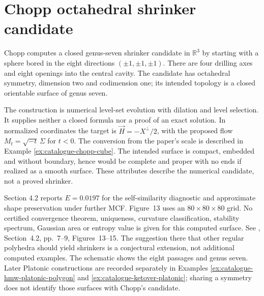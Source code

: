 \chapter{Chopp octahedral shrinker candidate}\label{sec:catalogue-chopp-octahedron}
\begin{example}\label{ex:catalogue-chopp-octahedron}
Chopp computes a closed genus-seven shrinker candidate in $\mathbb R^3$ by
starting with a sphere bored in the eight directions $(\pm1,\pm1,\pm1)$.
There are four drilling axes and eight openings into the central cavity.
The candidate has octahedral symmetry, dimension two and codimension one;
its intended topology is a closed orientable surface of genus seven.

The construction is numerical level-set evolution with dilation and level
selection. It supplies neither a closed formula nor a proof of an exact
solution. In normalized coordinates the target is
$\vec H=-X^\perp/2$, with the proposed flow
$M_t=\sqrt{-t}\,\Sigma$ for $t<0$. The conversion from the paper's scale
is described in Example \ref{ex:catalogue-chopp-cube}.
The intended surface is compact, embedded and without boundary, hence
would be complete and proper with no ends if realized as a smooth surface.
These attributes describe the numerical candidate, not a proved shrinker.

Section 4.2 reports $E=0.0197$ for the self-similarity diagnostic and
approximate shape preservation under further MCF. Figure~13 uses an
$80\times80\times80$ grid. No certified convergence theorem, uniqueness,
curvature classification, stability spectrum, Gaussian area or entropy
value is given for this computed surface.
See \cite{CatChopp1994}, Section~4.2, pp.~7--9, Figures~13--15.
The suggestion there that other regular polyhedra should yield shrinkers
is a conjectural extension, not additional computed examples.
The schematic shows the eight passages and genus seven. Later Platonic
constructions are recorded separately in
Examples \ref{ex:catalogue-hmw-platonic-polygon} and
\ref{ex:catalogue-ketover-platonic}; sharing a symmetry does not identify
those surfaces with Chopp's candidate.
\end{example}

